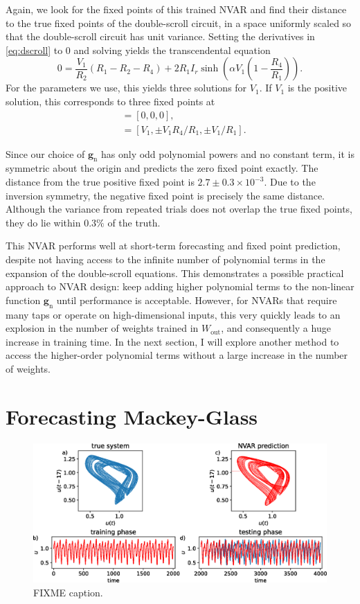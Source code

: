 Again, we look for the fixed points of this trained NVAR and find
their distance to the true fixed points of the double-scroll circuit,
in a space uniformly scaled so that the double-scroll circuit has unit
variance. Setting the derivatives in \cref{eq:dscroll} to $0$
and solving yields the transcendental equation
\begin{equation}
  0 = \frac{V_1}{R_2}(R_1 - R_2 - R_4) + 2 R_1 I_r \sinh\left(\alpha V_1 \left(1 - \frac{R_4}{R_1}\right)\right).
\end{equation}
For the parameters we use, this yields three solutions for $V_1$. If
$V_1$ is the positive solution, this corresponds to three fixed points
at
\begin{align}
  [V_1, V_2, I] &= [0, 0, 0], \\
                &= [V_1, \pm V_1 R_4 / R_1, \pm V_1 / R_1].
\end{align}

Since our choice of $\bm{g}_\text{n}$ has only odd polynomial powers
and no constant term, it is symmetric about the origin and predicts
the zero fixed point exactly. The distance from the true positive
fixed point is $2.7\pm0.3\times10^{-3}$. Due to the inversion
symmetry, the negative fixed point is precisely the same
distance. Although the variance from repeated trials does not overlap
the true fixed points, they do lie within $0.3\%$ of the truth.

This NVAR performs well at short-term forecasting and fixed point
prediction, despite not having access to the infinite number of
polynomial terms in the expansion of the double-scroll equations. This
demonstrates a possible practical approach to NVAR design: keep adding
higher polynomial terms to the non-linear function $\bm{g}_\text{n}$
until performance is acceptable. However, for NVARs that require many
taps or operate on high-dimensional inputs, this very quickly leads to
an explosion in the number of weights trained in $W_\text{out}$, and
consequently a huge increase in training time. In the next section, I
will explore another method to access the higher-order polynomial
terms without a large increase in the number of weights.

\section{Forecasting Mackey-Glass}

\begin{figure}
  \includegraphics[width=\textwidth]{figures/nvar-predict-mackey-glass}
  \caption{FIXME caption.}
  \label{fig:nvar-predict-mackey-glass}
\end{figure}
